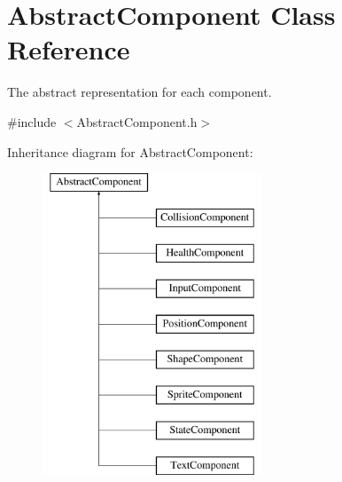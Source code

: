 \hypertarget{class_abstract_component}{\section{Abstract\-Component Class Reference}
\label{d1/dae/class_abstract_component}
}


The abstract representation for each component.  




{\ttfamily \#include $<$Abstract\-Component.\-h$>$}

Inheritance diagram for Abstract\-Component\-:\begin{figure}[H]
\begin{center}
\leavevmode
\includegraphics[height=9.000000cm]{d1/dae/class_abstract_component}
\end{center}
\end{figure}
